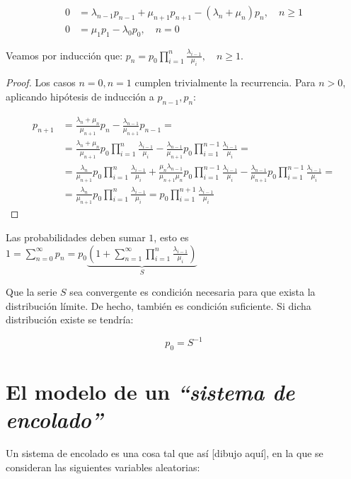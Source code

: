 \documentclass[a4paper,10pt]{scrartcl}
\theoremstyle{definition}
\numberwithin{equation}{section}
\begin{document}
\begin{align*}
0 &= \lambda_{n-1} p_{n-1} + \mu_{n+1} p_{n+1} - (\lambda_n + \mu_n) p_n, \quad n\ge 1\\
0 &= \mu_1 p_1 -\lambda_0 p_0, \quad n=0
\end{align*}

Veamos por inducción que: $p_n = p_0 \prod_{i=1}^n \frac{\lambda_{i-1}}{\mu_i}, \quad n\ge 1$.

\begin{proof}
 Los casos $n=0, n=1$ cumplen trivialmente la recurrencia. Para $n>0$, aplicando hipótesis de inducción a $p_{n-1}, p_{n}$:
 
 \begin{align*}
 p_{n+1} &= \frac{\lambda_n + \mu_n}{\mu_{n+1}} p_n - \frac{\lambda_{n-1}}{\mu_{n+1}}p_{n-1} = \\
         &= \frac{\lambda_n + \mu_n}{\mu_{n+1}} p_0 \prod_{i=1}^n \frac{\lambda_{i-1}}{\mu_i} - 
            \frac{\lambda_{n-1}}{\mu_{n+1}} p_0 \prod_{i=1}^{n-1} \frac{\lambda_{i-1}}{\mu_i} = \\
         &= \frac{\lambda_n}{\mu_{n+1}} p_0 \prod_{i=1}^n \frac{\lambda_{i-1}}{\mu_i} + 
            \frac{\mu_n \lambda_{n-1}}{\mu_{n+1}\mu_n} p_0 \prod_{i=1}^{n-1} \frac{\lambda_{i-1}}{\mu_i} - 
            \frac{\lambda_{n-1}}{\mu_{n+1}} p_0 \prod_{i=1}^{n-1} \frac{\lambda_{i-1}}{\mu_i} = \\
         &= \frac{\lambda_n}{\mu_{n+1}} p_0 \prod_{i=1}^n \frac{\lambda_{i-1}}{\mu_i} = p_0 \prod_{i=1}^{n+1} \frac{\lambda_{i-1}}{\mu_i}
 \end{align*}
\end{proof}

Las probabilidades deben sumar $1$, esto es $1 = \sum_{n=0}^{\infty} p_n = p_0 \underbrace{\left(1 + \sum_{n=1}^{\infty} \prod_{i=1}^n \frac{\lambda_{i-1}}{\mu_i} \right)}_{S}$

Que la serie $S$ sea convergente es condición necesaria para que exista la distribución límite. 
De hecho, también es condición suficiente. Si dicha distribución existe se tendría: 

\begin{equation}
 p_0 = S^{-1} 
 \label{eq:relp0}
\end{equation}


\section{El modelo de un \textit{``sistema de encolado''}}
Un sistema de encolado es una cosa tal que así [dibujo aquí], en la que se consideran las siguientes variables aleatorias:
\end{document}
